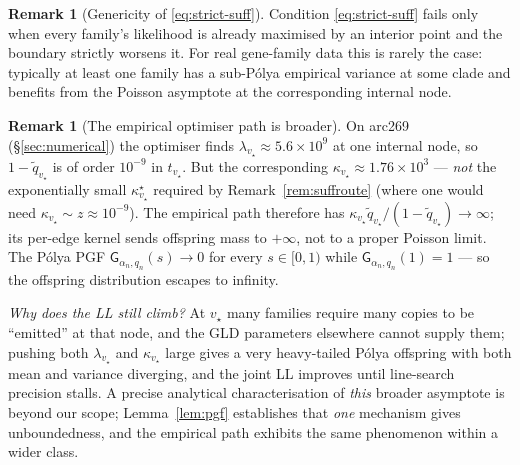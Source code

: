 \documentclass[11pt]{article}
\newcommand{\rate}{\kappa}             %
\newcommand{\dup}{\lambda}             %
\newcommand{\edgelen}{t}               %
\newcommand{\survq}{\tilde q}          %
\newcommand{\PGF}{\mathsf{G}}
\theoremstyle{definition}
\newtheorem{remark}[theorem]{Remark}
\begin{document}
\begin{remark}[Genericity of \eqref{eq:strict-suff}]
\label{rem:genericity}
Condition \eqref{eq:strict-suff} fails only when every family's
likelihood is already maximised by an interior point and the boundary
strictly worsens it. For real gene-family data this is rarely the
case: typically at least one family has a sub-Pólya empirical
variance at some clade and benefits from the Poisson asymptote at
the corresponding internal node.
\end{remark}

\begin{remark}[The empirical optimiser path is broader]
\label{rem:empirical-path}
On arc269 (\S\ref{sec:numerical}) the optimiser finds
$\dup_{v_\star} \approx 5.6\times10^9$ at one internal node, so
$1 - \survq_{v_\star}$ is of order $10^{-9}$ in $\edgelen_{v_\star}$.
But the corresponding $\rate_{v_\star} \approx 1.76\times 10^3$ ---
\emph{not} the exponentially small $\rate^\star_{v_\star}$ required
by Remark~\ref{rem:suffroute} (where one would need
$\rate_{v_\star} \sim z \approx 10^{-9}$). The empirical path
therefore has
$\rate_{v_\star} \survq_{v_\star}/(1 - \survq_{v_\star}) \to \infty$;
its per-edge kernel sends offspring mass to $+\infty$, not to a
proper Poisson limit. The Pólya PGF $\PGF_{\alpha_n, q_n}(s) \to 0$
for every $s\in[0,1)$ while $\PGF_{\alpha_n, q_n}(1) = 1$ --- so
the offspring distribution escapes to infinity.

\emph{Why does the LL still climb?} At $v_\star$ many families
require many copies to be ``emitted'' at that node, and the GLD
parameters elsewhere cannot supply them; pushing both
$\dup_{v_\star}$ and $\rate_{v_\star}$ large gives a very
heavy-tailed Pólya offspring with both mean and variance diverging,
and the joint LL improves until line-search precision stalls.
A precise analytical characterisation of \emph{this} broader
asymptote is beyond our scope; Lemma~\ref{lem:pgf} establishes that
\emph{one} mechanism gives unboundedness, and the empirical path
exhibits the same phenomenon within a wider class.
\end{remark}
\end{document}
